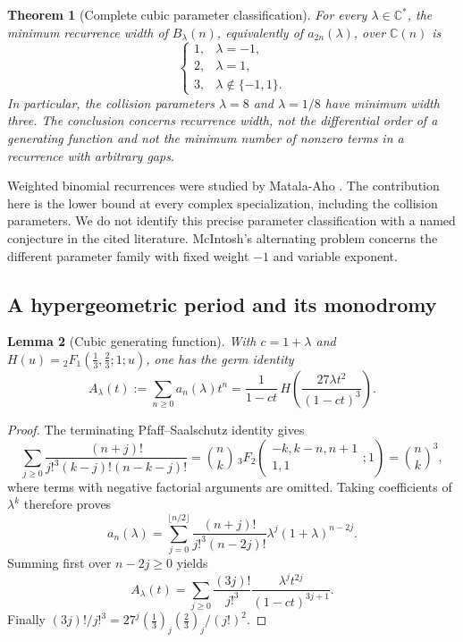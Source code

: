 \documentclass[11pt,a4paper]{article}
\newtheorem{theorem}{Theorem}[section]
\newtheorem{lemma}[theorem]{Lemma}
\theoremstyle{definition}
\theoremstyle{remark}
\numberwithin{equation}{section}
\begin{document}
\begin{theorem}[Complete cubic parameter classification]
\label{p6:thm:cubic-width}
For every $\lambda\in\mathbb C^*$, the minimum recurrence width of
$B_\lambda(n)$, equivalently of $a_{2n}(\lambda)$, over $\mathbb C(n)$ is
\[
 \boxed{\quad
 \begin{cases}
 1,&\lambda=-1,\\
 2,&\lambda=1,\\
 3,&\lambda\notin\{-1,1\}.
 \end{cases}\quad}
\]
In particular, the collision parameters $\lambda=8$ and $\lambda=1/8$
have minimum width three. The conclusion concerns recurrence width,
not the differential order of a generating function and not the minimum
number of nonzero terms in a recurrence with arbitrary gaps.
\end{theorem}

Weighted binomial recurrences were studied by Matala-Aho
\cite{p3:MatalaAho1991}. The contribution here is the lower bound at every
complex specialization, including the collision parameters. We do not
identify this precise parameter classification with a named conjecture
in the cited literature. McIntosh's alternating problem
\cite{p3:McIntosh1993} concerns the different parameter family with fixed
weight $-1$ and variable exponent.

\subsection{A hypergeometric period and its monodromy}

\begin{lemma}[Cubic generating function]
\label{p6:lem:cubic-hypergeom}
With $c=1+\lambda$ and
$H(u)={}_2F_1(\frac13,\frac23;1;u)$, one has the germ identity
\begin{equation}
\label{p6:eq:cubic-hypergeom}
 A_\lambda(t):=\sum_{n\geq0}a_n(\lambda)t^n
 =\frac{1}{1-ct}\,H\!\left(\frac{27\lambda t^2}{(1-ct)^3}\right).
\end{equation}
\end{lemma}
\begin{proof}
The terminating Pfaff--Saalschutz identity \cite[\S16.4.3]{p6:DLMF} gives
\[
 \sum_{j\geq0}
 \frac{(n+j)!}{j!^3(k-j)!(n-k-j)!}
 =\binom nk\,
 {}_3F_2\!\left(\begin{matrix}-k,k-n,n+1\\1,1\end{matrix};1\right)
 =\binom nk^3,
\]
where terms with negative factorial arguments are omitted. Taking
coefficients of $\lambda^k$ therefore proves
\[
 a_n(\lambda)=\sum_{j=0}^{\lfloor n/2\rfloor}
 \frac{(n+j)!}{j!^3(n-2j)!}\lambda^j(1+\lambda)^{n-2j}.
\]
Summing first over $n-2j\geq0$ yields
\[
 A_\lambda(t)=\sum_{j\geq0}\frac{(3j)!}{j!^3}
 \frac{\lambda^jt^{2j}}{(1-ct)^{3j+1}}.
\]
Finally $(3j)!/j!^3=27^j(\frac13)_j(\frac23)_j/(j!)^2$.
\end{proof}
\end{document}
